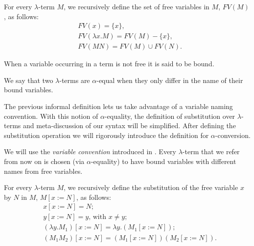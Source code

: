 \begin{definition}
  For every $\lambda$-term $M$, we recursively define the set of free variables in $M$, $FV(M)$, as follows:  
  \begin{align*}
    & FV( x ) = \{ x \}, \\
    & FV( \lambda x . M ) = FV(M) - \{ x \}, \\
    & FV( M N ) = FV(M) \cup FV(N).
  \end{align*}

  When a variable occurring in a term is not free it is said to be bound.
\end{definition}


\begin{definition}
  We say that two $\lambda$-terms are $\alpha$-equal when they only differ in the name of their bound variables.
\end{definition}

\begin{remark}
  The previous informal definition lets us take advantage of a variable naming convention.
  With this notion of $\alpha$-equality, the definition of substitution over $\lambda$-terms and meta-discussion of our syntax will be simplified.
  After defining the substitution operation we will rigorously introduce the definition for $\alpha$-conversion.
\end{remark}

\begin{convention} 
  We will use the \textit{variable convention} introduced in \cite{Barendregt1987}. Every $\lambda$-term that we refer from now on is chosen (via $\alpha$-equality) to have bound variables with different names from free variables.
\end{convention}

\begin{definition}[Substitution]
  For every $\lambda$-term $M$, we recursively define the substitution of the free variable $x$ by $N$ in $M$, $M[x := N]$, as follows:
  \begin{align*}
    & x[x := N] = N; \\
    & y[x := N] = y \text{, with } x \neq y; \\
    & (\lambda y . M_1)[x := N] = \lambda y . (M_1[x := N]); \\
    & (M_1 M_2)[x := N] = (M_1[x := N]) (M_2[x := N]).
  \end{align*}
\end{definition}

